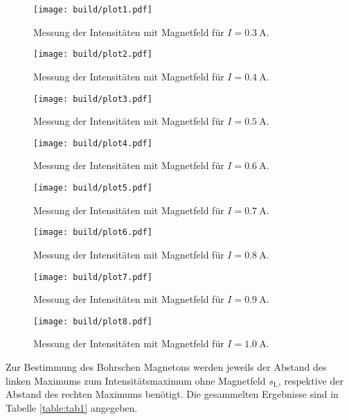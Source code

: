 \begin{figure}
  \centering
  \texttt{[image: build/plot1.pdf]}
  \caption{Messung der Intensitäten mit Magnetfeld für $I=\SI{0.3}{\ampere}$.}
  \label{fig:plot1}
\end{figure}

\begin{figure}
  \centering
  \texttt{[image: build/plot2.pdf]}
  \caption{Messung der Intensitäten mit Magnetfeld für $I=\SI{0.4}{\ampere}$.}
  \label{fig:plot2}
\end{figure}

\begin{figure}
  \centering
  \texttt{[image: build/plot3.pdf]}
  \caption{Messung der Intensitäten mit Magnetfeld für $I=\SI{0.5}{\ampere}$.}
  \label{fig:plot3}
\end{figure}

\begin{figure}
  \centering
  \texttt{[image: build/plot4.pdf]}
  \caption{Messung der Intensitäten mit Magnetfeld für $I=\SI{0.6}{\ampere}$.}
  \label{fig:plot4}
\end{figure}

\begin{figure}
  \centering
  \texttt{[image: build/plot5.pdf]}
  \caption{Messung der Intensitäten mit Magnetfeld für $I=\SI{0.7}{\ampere}$.}
  \label{fig:plot5}
\end{figure}

\begin{figure}
  \centering
  \texttt{[image: build/plot6.pdf]}
  \caption{Messung der Intensitäten mit Magnetfeld für $I=\SI{0.8}{\ampere}$.}
  \label{fig:plot6}
\end{figure}

\begin{figure}
  \centering
  \texttt{[image: build/plot7.pdf]}
  \caption{Messung der Intensitäten mit Magnetfeld für $I=\SI{0.9}{\ampere}$.}
  \label{fig:plot7}
\end{figure}

\begin{figure}
  \centering
  \texttt{[image: build/plot8.pdf]}
  \caption{Messung der Intensitäten mit Magnetfeld für $I=\SI{1.0}{\ampere}$.}
  \label{fig:plot8}
\end{figure}

Zur Bestimmung des Bohrschen Magnetons werden jeweils der Abstand des linken Maximums zum Intensitätsmaximum ohne Magnetfeld $s_\text{L}$, respektive der Abstand des rechten Maximums benötigt. %
Die gesammelten Ergebnisse sind in Tabelle \ref{table:tab1} angegeben.


